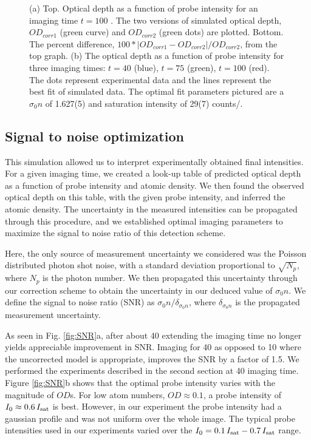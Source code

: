 \documentclass[12pt]{iopart}
\begin{document}
\begin{figure}
\caption{(a) Top. Optical depth as a function of probe intensity for an imaging time $t=100$ \us. The two versions of simulated optical depth, $OD_{corr1}$ (green curve) and $OD_{corr2}$ (green dots) are plotted. Bottom. The percent difference, $100*|OD_{corr1}-OD_{corr2}|/OD_{corr2}$, from the top graph. (b) The optical depth as a function of probe intensity for three imaging times: $t=40$\us{} (blue),  $t=75$\us{} (green),  $t=100$\us{} (red). The dots represent experimental data and the lines represent the best fit of simulated data. The optimal fit parameters pictured are a $\sigma_0 n$ of 1.627(5) and saturation intensity of 29(7) counts/\us{}.  }  
\label{fig:compareModelsAndIsat}
\end{figure}

\subsection{Signal to noise optimization}
This simulation allowed us to interpret experimentally obtained final intensities. For a given imaging time, we created a look-up table of predicted optical depth as a function of probe intensity and atomic density. We then found the observed optical depth on this table, with the given probe intensity, and inferred the atomic density. The uncertainty in the measured intensities can be propagated through this procedure, and we established optimal imaging parameters to maximize the signal to noise ratio of this detection scheme. 
\par Here, the only source of measurement uncertainty we considered was the Poisson distributed photon shot noise, with a standard deviation proportional to $\sqrt{N_p}$, where $N_p$ is the photon number. We then propagated this uncertainty through our correction scheme to obtain the uncertainty in our deduced value of $\sigma_0 n$. We define the signal to noise ratio (SNR) as $\sigma_0 n/\delta_{\sigma_0 n}$, where $ \delta_{\sigma_0 n}$ is the propagated measurement uncertainty.
\par As seen in Fig. \ref{fig:SNR}a, after about 40 \us{} extending the imaging time no longer yields appreciable improvement in SNR. Imaging for 40 \us{} as opposed to 10 \us{} where the uncorrected model is appropriate, improves the SNR by a factor of  1.5. We performed the experiments described in the second section at 40 \us{} imaging time. Figure \ref{fig:SNR}b shows that the optimal probe intensity varies with the magnitude of $OD$s. For low atom numbers, $OD\approx0.1$, a probe intensity of $I_0\approx0.6\,I_{\rm{sat}}$ is best. However, in our experiment the probe intensity had a gaussian profile and was not uniform over the whole image.  The typical probe intensities used in our experiments varied over the $I_0=0.1\,I_{\rm{sat}}-0.7\,I_{\rm{sat}}$  range.
\end{document}
